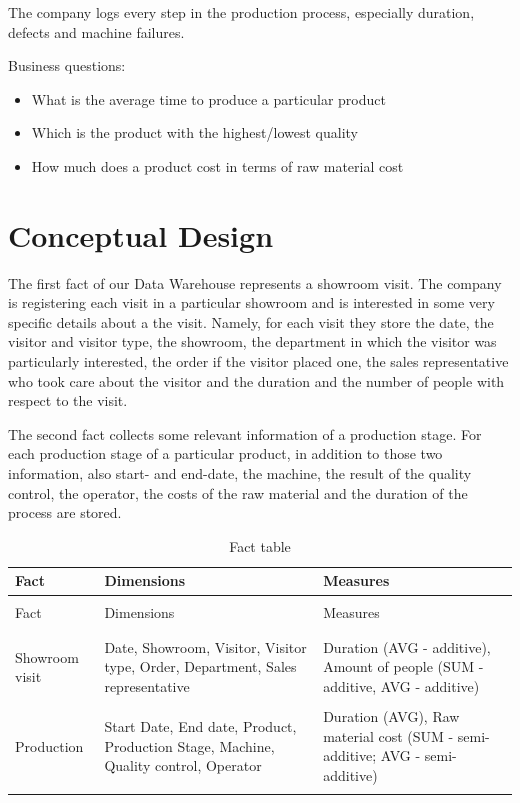 \documentclass[letterpaper,12pt]{article}
\begin{document}
The company logs every step in the production process, especially duration, defects and machine failures.

Business questions:
\begin{itemize}
        \item What is the average time to produce a particular product
        \item Which is the product with the highest/lowest quality
        \item How much does a product cost in terms of raw material cost
\end{itemize}

\section{Conceptual Design}

The first fact of our Data Warehouse represents a showroom visit. The company is registering each visit in a particular showroom and is interested in some very specific details about a the visit. Namely, for each visit they store the date, the visitor and visitor type, the showroom, the department in which the visitor was particularly interested, the order if the visitor placed one, the sales representative who took care about the visitor and the duration and the number of people with respect to the visit.

The second fact collects some relevant information of a production stage. For each production stage of a particular product, in addition to those two information, also start- and end-date, the machine, the result of the quality control, the operator, the costs of the raw material and the duration of the process are stored.

\begingroup
\renewcommand\arraystretch{0.5}
\begin{longtable}{p{3cm}p{6cm}p{4cm}}
        \caption{Fact table} \\
        Fact & Dimensions & Measures \\
        \endfirsthead \\
        Fact & Dimensions & Measures \\
        \endhead \\
        \hline \\
        Showroom visit & Date, Showroom, Visitor, Visitor type, Order, Department, Sales representative & Duration (AVG - additive), Amount of people (SUM - additive, AVG - additive) \\
        \hline \\
        Production & Start Date, End date, Product, Production Stage, Machine, Quality control, Operator & Duration (AVG), Raw material cost (SUM - semi-additive; AVG - semi-additive) \\
        \hline \\
\end{longtable}
\endgroup
\end{document}
